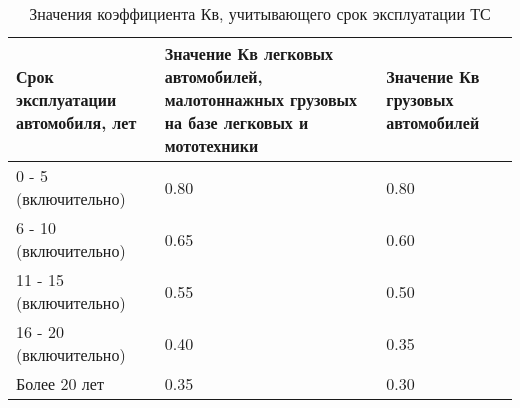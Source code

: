 \noindent  \begin{table}[H]
  	 \label{tab:KB}
	\caption{\footnotesize {Значения коэффициента Кв, учитывающего срок эксплуатации ТС}}
		 \begin{tabular}{|p{47mm} |p{53mm}| p{50mm}|}
	\hline
 		Срок эксплуатации автомобиля, лет & Значение Кв легковых автомобилей, малотоннажных грузовых на базе легковых и мототехники & Значение Кв грузовых автомобилей \\ \hline
 		0 - 5 (включительно)              & 0.80                                                                                    & 0.80                             \\ \hline
 		6 - 10 (включительно)             & 0.65                                                                                    & 0.60                             \\ \hline
 		11 - 15 (включительно)            & 0.55                                                                                    & 0.50                             \\ \hline
 		16 - 20 (включительно)            & 0.40                                                                                    & 0.35                             \\ \hline
 		Более 20 лет                      & 0.35                                                                                    & 0.30                            \\ \hline
 	\end{tabular}
\end{table}


